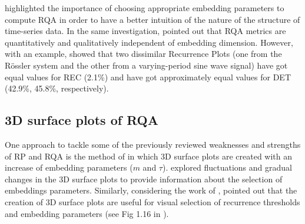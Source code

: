 \cite{iwanski1998} highlighted the importance of choosing 
appropriate embedding parameters to compute RQA 
in order to have a better intuition of the nature 
of the structure of time-series data.
In the same investigation, \cite{iwanski1998} pointed out 
that RQA metrics are quantitatively and qualitatively independent of 
embedding dimension. However, with an example, \cite{iwanski1998} 
showed that two dissimilar Recurrence Plots 
(one from the R\"{o}ssler system and 
the other from a varying-period sine wave signal) have got equal 
values for REC (2.1\%) and have got approximately equal values 
for DET (42.9\%, 45.8\%, respectively).

\subsection{3D surface plots of RQA} \label{sec:3d_rqa}
One approach to tackle some of the previously reviewed weaknesses and 
strengths of RP and RQA is the method of \cite{zbilut1992} 
in which 3D surface plots are created with an increase of 
embedding parameters ($m$ and $\tau$). 
\cite{zbilut1992} explored fluctuations and gradual 
changes in the 3D surface plots to provide information 
about the selection of embeddings parameters. 
Similarly, considering the work of \cite{webber2018}, 
\cite{marwan2015} pointed out that the creation 
of 3D surface plots are useful for visual selection of 
recurrence thresholds and embedding parameters 
(see Fig 1.16 in \cite{marwan2015}). 

